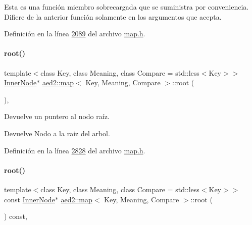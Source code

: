 Esta es una función miembro sobrecargada que se suministra por conveniencia. Difiere de la anterior función solamente en los argumentos que acepta. 

Definición en la línea \hyperlink{map_8h_source_l02089}{2089} del archivo \hyperlink{map_8h_source}{map.\+h}.

\mbox{\label{classaed2_1_1map_a07ab50eda249a57858a34037d4c4c7b2_a07ab50eda249a57858a34037d4c4c7b2}} 
\paragraph{\texorpdfstring{root()}{root()}\hspace{0.1cm}{\footnotesize\ttfamily [1/2]}}
{\footnotesize\ttfamily template$<$class Key, class Meaning, class Compare = std\+::less$<$\+Key$>$$>$ \\
\hyperlink{structaed2_1_1map_1_1InnerNode}{Inner\+Node}$\ast$ \hyperlink{classaed2_1_1map}{aed2\+::map}$<$ Key, Meaning, Compare $>$\+::root (\begin{DoxyParamCaption}{ }\end{DoxyParamCaption})\hspace{0.3cm}{\ttfamily [inline]}, {\ttfamily [private]}}



Devuelve un puntero al nodo raíz. 

\begin{DoxyReturn}{Devuelve}
Nodo a la raiz del arbol. 
\end{DoxyReturn}


Definición en la línea \hyperlink{map_8h_source_l02828}{2828} del archivo \hyperlink{map_8h_source}{map.\+h}.

\mbox{\label{classaed2_1_1map_a66fe019d885578cc52949409f80858eb_a66fe019d885578cc52949409f80858eb}} 
\paragraph{\texorpdfstring{root()}{root()}\hspace{0.1cm}{\footnotesize\ttfamily [2/2]}}
{\footnotesize\ttfamily template$<$class Key, class Meaning, class Compare = std\+::less$<$\+Key$>$$>$ \\
const \hyperlink{structaed2_1_1map_1_1InnerNode}{Inner\+Node}$\ast$ \hyperlink{classaed2_1_1map}{aed2\+::map}$<$ Key, Meaning, Compare $>$\+::root (\begin{DoxyParamCaption}{ }\end{DoxyParamCaption}) const\hspace{0.3cm}{\ttfamily [inline]}, {\ttfamily [private]}}


